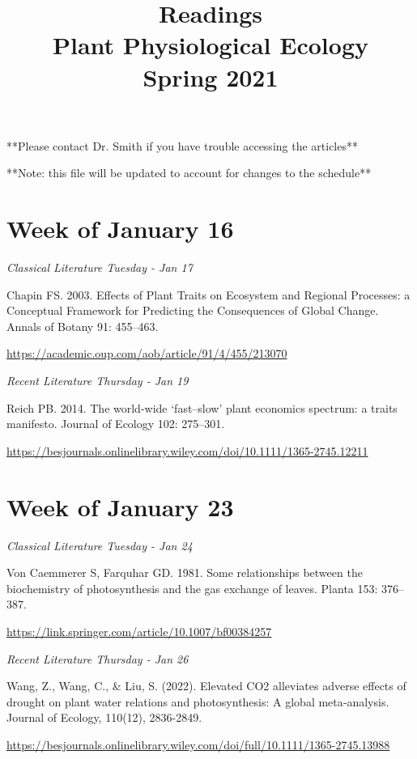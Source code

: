 \documentclass[12pt, notitlepage]{article}   	%
\title{
	\textbf{
		Readings
	} \\
	\large Plant Physiological Ecology \\
	\large Spring 2021
}
\date{\vspace{-5ex}}
\begin{document}
{\selectfont %

\maketitle

**Please contact Dr. Smith if you have trouble accessing the articles**

**Note: this file will be updated to account for changes to the schedule**

\section*{Week of January 16}
\textit{Classical Literature Tuesday - Jan 17} \par
Chapin FS. 2003. Effects of Plant Traits on Ecosystem and Regional Processes: 
a Conceptual Framework for Predicting the Consequences of Global Change. 
Annals of Botany 91: 455–463. \par
\url{https://academic.oup.com/aob/article/91/4/455/213070}

\textit{Recent Literature Thursday - Jan 19} \par
Reich PB. 2014. The world-wide ‘fast–slow’ plant economics spectrum: a traits manifesto. 
Journal of Ecology 102: 275–301. \par
\url{https://besjournals.onlinelibrary.wiley.com/doi/10.1111/1365-2745.12211}
\par

\section*{Week of January 23}
\textit{Classical Literature Tuesday - Jan 24} \par
Von Caemmerer S, Farquhar GD. 1981. Some relationships between the biochemistry of 
photosynthesis and the gas exchange of leaves. Planta 153: 376–387. \par
\url{https://link.springer.com/article/10.1007/bf00384257}

\textit{Recent Literature Thursday - Jan 26} \par
Wang, Z., Wang, C., & Liu, S. (2022). Elevated CO2 alleviates adverse effects of drought 
on plant water relations and photosynthesis: A global meta‐analysis. Journal of 
Ecology, 110(12), 2836-2849. \par
\url{https://besjournals.onlinelibrary.wiley.com/doi/full/10.1111/1365-2745.13988}

}
\end{document}
